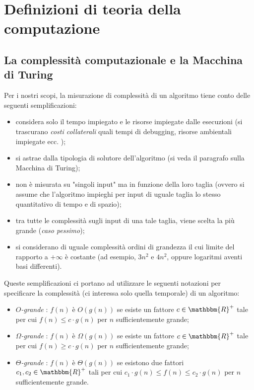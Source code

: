 \documentclass[12pt, a4paper]{report}
\theoremstyle{definition}
\begin{document}
		\section{Definizioni di teoria della computazione \cite{11}}
			\subsection{La complessità computazionale e la Macchina di Turing}
				Per i nostri scopi, la misurazione di complessità di un algoritmo tiene conto delle seguenti semplificazioni:
				\begin{itemize}
					\item considera solo il tempo impiegato e le risorse impiegate dalle esecuzioni (si trascurano \emph{costi collaterali} quali tempi di debugging, risorse ambientali impiegate ecc. );
					\item si astrae dalla tipologia di solutore dell'algoritmo (si veda il paragrafo sulla Macchina di Turing);
					\item non è misurata su "singoli input" ma in funzione della loro taglia (ovvero si assume che l'algoritmo impieghi per input di uguale taglia lo stesso quantitativo di tempo e di spazio);
					\item tra tutte le complessità sugli input di una tale taglia, viene scelta la più grande (\emph{caso pessimo});
					\item si considerano di uguale complessità ordini di grandezza il cui limite del rapporto a $+\infty$ è costante (ad esempio, $3n^2$ e $4n^2$, oppure logaritmi aventi basi differenti).
				\end{itemize}
				Queste semplificazioni ci portano ad utilizzare le seguenti notazioni per specificare la complessità (ci interessa solo quella temporale) di un algoritmo:
				\begin{itemize}
					\item \emph{$O$-grande} : $f(n)$ è $O(g(n))$ se esiste un fattore $c\in\mathbbm{R}^+$ tale per cui $f(n)\le c\cdot g(n)$ per $n$ sufficientemente grande;
					\item \emph{$\Omega$-grande} : $f(n)$ è $\Omega(g(n))$ se esiste un fattore $c\in\mathbbm{R}^+$ tale per cui $f(n)\ge c\cdot g(n)$ per $n$ sufficientemente grande;
					\item \emph{$\Theta$-grande} : $f(n)$ è $\Theta(g(n))$ se esistono due fattori $c_1,c_2\in\mathbbm{R}^+$ tali per cui $c_1\cdot g(n)\le f(n)\le c_2\cdot g(n)$ per $n$ sufficientemente grande.
				\end{itemize}
\end{document}
